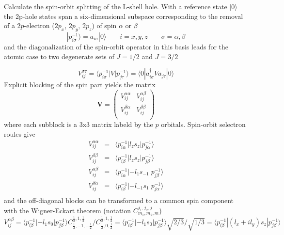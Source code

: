 \documentclass{article}
\begin{document}
Calculate the spin-orbit splitting of the L-shell hole. With a reference state 
$|0\rangle$ the 2p-hole states span a six-dimensional subspace corresponding to the removal of a $2p$-electron ($2p_x$, $2p_y$, $2p_z$) of spin $\alpha$ or $\beta$
\begin{equation}
    |p_{i\sigma}^{-1}\rangle = a_{i\sigma}|0\rangle\qquad i=x,y,z \qquad\sigma=\alpha,\beta
\end{equation}
and the diagonalization of the spin-orbit operator in this basis leads for the atomic case to two degenerate sets of $J=1/2$ and $J=3/2$

\begin{equation}
 V^{\sigma\tau}_{ij} = \langle p_{i\sigma}^{-1}|V|p_{j\tau}^{-1}\rangle
                     = \langle 0 | a_{i\sigma}^\dagger V a_{j\tau} |0\rangle
\end{equation}
Explicit blocking of the spin part yields the matrix
\begin{equation}
 \mathbf{V} = \begin{pmatrix}
              V^{\alpha\alpha}_{ij} & V_{ij}^{\alpha\beta} \\
              V^{\beta\alpha}_{ij}  & V_{ij}^{\beta\beta} \\
            \end{pmatrix}
\end{equation}
where each subblock is a 3x3 matrix labeld by the $p$ orbitals.
Spin-orbit selectron roules give
\begin{eqnarray}
 V^{\alpha\alpha}_{ij} &=& \langle p_{i\alpha}^{-1}|l_z s_z |p_{j\alpha}^{-1}\rangle \\
 V^{\beta\beta}_{ij}   &=& \langle p_{i\beta}^{-1}|l_z s_z |p_{j\beta}^{-1}\rangle \\
 V^{\alpha\beta}_{ij}  &=& \langle p_{i\alpha}^{-1}|-l_{1} s_{-1} |p_{j\beta}^{-1}\rangle \\
 V^{\beta\alpha}_{ij}  &=& \langle p_{i\beta}^{-1}|-l_{-1} s_{1} |p_{j\alpha}^{-1}\rangle \\
\end{eqnarray}
and the off-diagonal blocks can be transformed to a common spin component with
the Wigner-Eckart theorem (notation $C^{j_1,j_2,j}_{m_1,m_2,m}$)
\begin{equation}
 V^{\alpha\beta}_{ij}  = \langle p_{i\beta }^{-1}|-l_{1} s_{0}  |p_{j\beta}^{-1}\rangle 
                         C^{\frac 1 2,1,\frac 1 2}_{\frac 1 2,-1,-\frac 1 2}/
                         C^{\frac 1 2,1,\frac 1 2}_{\frac 1 2, 0,\frac 1 2}
                       = \langle p_{i\beta }^{-1}|-l_{1} s_{0}  |p_{j\beta}^{-1}\rangle \sqrt{2/3}/\sqrt{1/3}
                       = \langle p_{i\beta }^{-1}|(l_x+il_y) s_z  |p_{j\beta}^{-1}\rangle
\end{equation}
\end{document}
